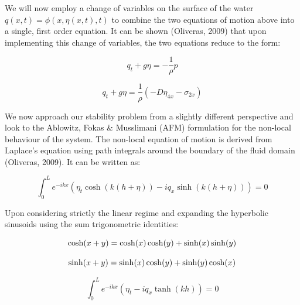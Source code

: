 \documentclass{article}
\begin{document}
\vspace{10} 

We will now employ a change of variables on the surface of the water \(q(x,t) = \phi(x,\eta(x,t),t) \) to combine the two equations of motion above into a single, first order equation. It can be shown (Oliveras, 2009) that upon implementing this change of variables, the two equations reduce to the form:

\begin{equation} \label{no}
q_{t} + g\eta = -\frac{1}{\rho}p
\end{equation}


\begin{equation} \label{local}
q_{t} + g\eta = \frac{1}{\rho}( -D\eta_{4x} - \sigma_{2x} )
\end{equation}

\vspace{10}

We now approach our stability problem from a slightly different perspective and look to the Ablowitz, Fokas & Musslimani (AFM) formulation for the non-local behaviour of the system. The non-local equation of motion is derived from Laplace's equation using path integrals around the boundary of the fluid domain (Oliveras, 2009). It can be written as:


\begin{equation} \label{no}
\int_{0}^{L} e^{-ikx}(\eta_{t}\cosh(k(h+\eta)) - iq_{x}\sinh(k(h+\eta))) = 0
\end{equation}

Upon considering strictly the linear regime and expanding the hyperbolic sinusoids using the sum trigonometric identities:

\begin{equation} \label{no}
\cosh(x+y) = \cosh(x)\cosh(y) + \sinh(x)\sinh(y) \\
\end{equation}

\begin{equation} \label{no}
\sinh(x+y) = \sinh(x)\cosh(y) + \sinh(y)\cosh(x) \\
\end{equation}


\begin{equation} \label{non-local}
\int_{0}^{L} e^{-ikx}(\eta_{t} - iq_{x}\tanh(kh)) = 0
\end{equation}
\end{document}
